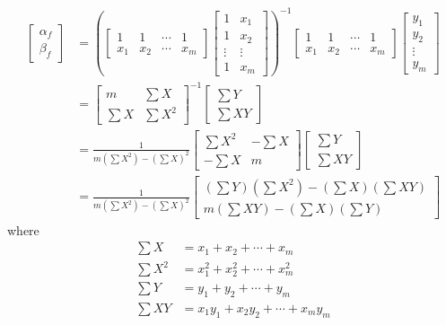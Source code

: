 \begin{align}
\begin{bmatrix}
\alpha_f \\
\beta_f
\end{bmatrix}
&=
\left(
\begin{bmatrix}
1 & 1 & \cdots & 1 \\
x_1 & x_2 & \cdots & x_m
\end{bmatrix}
\begin{bmatrix}
1 & x_1 \\
1 & x_2 \\
\vdots & \vdots \\
1 & x_m
\end{bmatrix} 
\right)^{-1}
\begin{bmatrix}
1 & 1 & \cdots & 1 \\
x_1 & x_2 & \cdots & x_m
\end{bmatrix}
\begin{bmatrix}
y_1 \\
y_2 \\
\vdots \\
y_m
\end{bmatrix} \nonumber \\
&= 
\begin{bmatrix}
m & \sum X \\
\sum X & \sum X^2
\end{bmatrix}^{-1}
\begin{bmatrix}
\sum Y \\
\sum XY
\end{bmatrix} \nonumber  \\
&=
\frac{1}{m(\sum X^2) - (\sum X)^2}
\begin{bmatrix}
\sum X^2 & -\sum X \\
-\sum X & m
\end{bmatrix}
\begin{bmatrix}
\sum Y \\
\sum XY
\end{bmatrix} \nonumber \\
&=
\frac{1}{m(\sum X^2) - (\sum X)^2}
\begin{bmatrix}
(\sum Y) (\sum X^2) - (\sum X) (\sum XY) \\
m (\sum XY) - (\sum X) (\sum Y)
\end{bmatrix}
\end{align}
where 
\begin{subequations}
\begin{align}
\sum X &= x_1 + x_2 + \cdots + x_m \\
\sum X^2 &= x_1^2 + x_2^2 + \cdots + x_m^2 \\
\sum Y &= y_1 + y_2 + \cdots + y_m \\
\sum XY &= x_1y_1 + x_2y_2 + \cdots + x_my_m   
\end{align}
\end{subequations}
